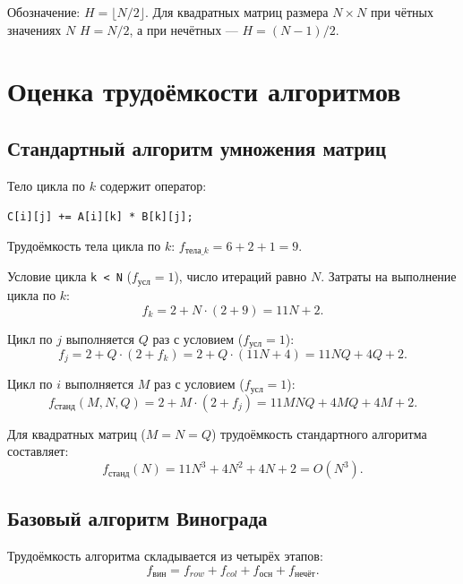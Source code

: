 Обозначение: $H = \lfloor N / 2 \rfloor$. Для квадратных матриц размера $N \times N$ при чётных значениях $N$ $H = N / 2$, а при нечётных --- $H = (N - 1) / 2$.

\section{Оценка трудоёмкости алгоритмов}

\subsection{Стандартный алгоритм умножения матриц}

Тело цикла по $k$ содержит оператор:
\begin{center}
\texttt{C[i][j] += A[i][k] * B[k][j];}
\end{center}
Трудоёмкость тела цикла по $k$: $f_{\text{тела\_}k} = 6 + 2 + 1 = 9$.

Условие цикла \texttt{k < N} ($f_{\text{усл}} = 1$), число итераций равно $N$. Затраты на выполнение цикла по $k$:
\begin{equation}
    f_k = 2 + N \cdot (2 + 9) = 11N + 2.
\end{equation}

Цикл по $j$ выполняется $Q$ раз с условием ($f_{\text{усл}} = 1$):
\begin{equation}
    f_j = 2 + Q \cdot (2 + f_k) = 2 + Q \cdot (11N + 4) = 11NQ + 4Q + 2.
\end{equation}

Цикл по $i$ выполняется $M$ раз с условием ($f_{\text{усл}} = 1$):
\begin{equation}
    f_{\text{станд}}(M, N, Q) = 2 + M \cdot (2 + f_j) = 11MNQ + 4MQ + 4M + 2.
\end{equation}

Для квадратных матриц ($M = N = Q$) трудоёмкость стандартного алгоритма составляет:
\begin{equation}
    f_{\text{станд}}(N) = 11N^3 + 4N^2 + 4N + 2 = O(N^3).
\end{equation}

\subsection{Базовый алгоритм Винограда}

Трудоёмкость алгоритма складывается из четырёх этапов:
\begin{equation}
    f_{\text{вин}} = f_{row} + f_{col} + f_{\text{осн}} + f_{\text{нечёт}}.
\end{equation}

